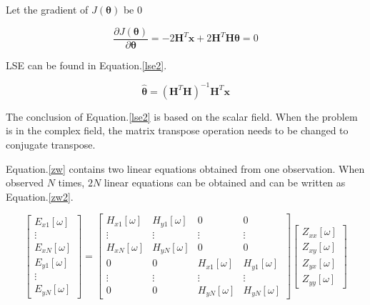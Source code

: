 \documentclass[9pt,a4paper,twoside]{rho-class/rho}
\begin{document}
Let the gradient of $J(\bm{\theta})$ be 0

\begin{equation}
    \label{err4}
    \dfrac{\partial J(\bm{\theta})}{\partial \bm{\theta}} = -2\mathbf{H}^T\bm{x}+2\mathbf{H}^T\mathbf{H}\bm{\theta}=0
\end{equation}

LSE can be found in Equation.\eqref{lse2}. 

\begin{equation}
    \label{lse2}
    \hat{\bm{\theta}} = (\mathbf{H}^T\mathbf{H})^{-1}\mathbf{H}^T\bm{x}
\end{equation}

The conclusion of Equation.\eqref{lse2} is based on the scalar field. When the problem is in the complex field, the matrix transpose operation needs to be changed to conjugate transpose.

Equation.\eqref{zw} contains two linear equations obtained from one observation. When observed $N$ times, $2N$ linear equations can be obtained and can be written as Equation.\eqref{zw2}.

\begin{equation}
    \label{zw2}
    \begin{bmatrix}
        E_{x1}[\omega] \\
        \vdots \\
        E_{xN}[\omega] \\
        E_{y1}[\omega] \\
        \vdots \\
        E_{yN}[\omega]
    \end{bmatrix}=\begin{bmatrix}
        H_{x1}[\omega] & H_{y1}[\omega] & 0 & 0\\ 
        \vdots & \vdots & \vdots & \vdots\\
        H_{xN}[\omega] & H_{yN}[\omega] & 0 & 0\\
         0 & 0 & H_{x1}[\omega] & H_{y1}[\omega]\\
         \vdots & \vdots & \vdots & \vdots\\
         0 & 0 & H_{yN}[\omega] & H_{yN}[\omega]
    \end{bmatrix}\begin{bmatrix}
        Z_{xx}[\omega] \\
        Z_{xy}[\omega] \\
        Z_{yx}[\omega] \\
        Z_{yy}[\omega] 
    \end{bmatrix}
\end{equation}
\end{document}
